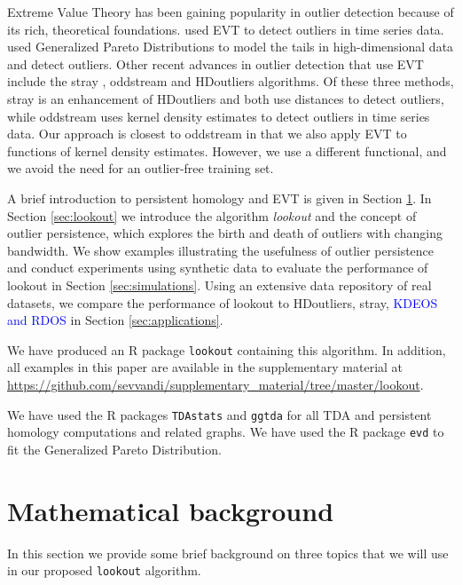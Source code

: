 \documentclass[12pt]{article}
\theoremstyle{definition}
\theoremstyle{definition}
\theoremstyle{definition}
\theoremstyle{remark}
\begin{document}
Extreme Value Theory has been gaining popularity in outlier detection because of its rich, theoretical foundations. \citet{Burridge2006} used EVT to detect outliers in time series data. \citet{Clifton2014} used Generalized Pareto Distributions to model the tails in high-dimensional data and detect outliers. Other recent advances in outlier detection that use EVT include the stray \citep{stray}, oddstream \citep{talagala2019anomaly} and HDoutliers \citep{wilkinson2017visualizing} algorithms. Of these three methods, stray is an enhancement of HDoutliers and both use distances to detect outliers, while oddstream uses kernel density estimates to detect outliers in time series data. Our approach is closest to oddstream in that we also apply EVT to functions of kernel density estimates. However, we use a different functional, and we avoid the need for an outlier-free training set.

A brief introduction to persistent homology and EVT is given in Section \ref{sec:methodology}. In Section \ref{sec:lookout} we introduce the algorithm \emph{lookout} and the concept of outlier persistence, which explores the birth and death of outliers with changing bandwidth. We show examples illustrating the usefulness of outlier persistence and conduct experiments using synthetic data to evaluate the performance of lookout in Section \ref{sec:simulations}. Using an extensive data repository of real datasets, we compare the performance of lookout to HDoutliers, stray, \textcolor{blue}{KDEOS and RDOS} in Section \ref{sec:applications}.

We have produced an R package \texttt{lookout} \citep{lookoutR} containing this algorithm. In addition, all examples in this paper are available in the supplementary material at \url{https://github.com/sevvandi/supplementary_material/tree/master/lookout}.

We have used the R packages \texttt{TDAstats} \citep{tdastatsR} and \texttt{ggtda} \citep{ggdta} for all TDA and persistent homology computations and related graphs. We have used the R package \texttt{evd} \citep{evdR} to fit the Generalized Pareto Distribution.

\hypertarget{sec:methodology}{%
\section{Mathematical background}\label{sec:methodology}}

In this section we provide some brief background on three topics that we will use in our proposed \texttt{lookout} algorithm.
\end{document}

